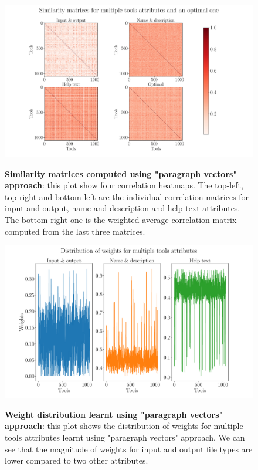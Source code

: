 \begin{figure}[h]
\begin{centering}
    {\includegraphics[scale=0.35]{figures/Similarity_matrices_doc2vec.pdf}}
    \caption[Similarity matrices using doc2vec]{\textbf{Similarity matrices computed using "paragraph vectors" approach}: this plot show four correlation heatmaps. The top-left, top-right and bottom-left are the individual correlation matrices for input and output, name and description and help text attributes. The bottom-right one is the weighted average correlation matrix computed from the last three matrices.}
\end{centering}
\end{figure}

\begin{figure}[h]
\begin{centering}
    {\includegraphics[scale=0.35]{figures/Weights_doc2vec.pdf}}
    \caption[Weights distribution for doc2vec]{\textbf{Weight distribution learnt using "paragraph vectors" approach}: this plot shows the distribution of weights for multiple tools attributes learnt using "paragraph vectors" approach. We can see that the magnitude of weights for input and output file types are lower compared to two other attributes. }
\end{centering}
\end{figure}



